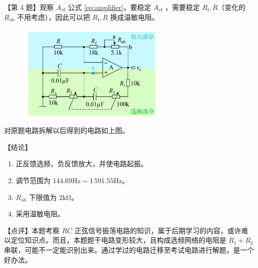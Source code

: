 \documentclass[UTF8]{ctexart}
\newcommand\xb[1]{_\mathrm{#1}}
\begin{document}
【第 4 题】观察 $A_{v\mathrm{f}}$ 公式 \eqref{eq:amplifier}，要稳定 $A_{v\mathrm{f}}$ ，需要稳定 $R\xb{f},R$（变化的 $R\xb{ab}$ 不用考虑），因此可以把 $R\xb{f},R$ 换成温敏电阻。

\begin{figure}[htb]
    \centering
    \includegraphics[width=7cm]{题解.png}
\end{figure}
对原题电路拆解以后得到的电路如上图。

{\color{cyan!80!black} 【结论】
\begin{enumerate}[itemsep=0pt, parsep=0pt]
\color{cyan!80!black}
    \item 正反馈选频，负反馈放大，并使电路起振。
    \item 调节范围为 $144.69\mathrm{Hz} \sim 1\,591.55\mathrm{Hz}$。
    \item $R\xb{ab}$ 下限值为 $2\mathrm{k\Omega}$。
    \item 采用温敏电阻。
\end{enumerate}

【点评】本题考察 $RC$ 正弦信号振荡电路的知识，属于后期学习的内容，或许难以定位知识点。而且，本题题干电路变形较大，且构成选频网络的电阻是 $R_1+R_2$ 串联，可能不一定能识别出来。通过学过的电路迁移至考试电路进行解题，是一个好办法。
}
\end{document}
